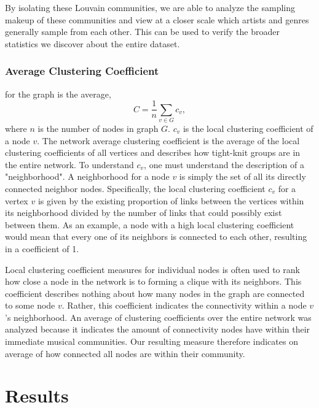 \documentclass[pageno]{jpaper}
\begin{document}
By isolating these Louvain communities, we are able to analyze the sampling makeup of these communities and view at a closer scale which artists and genres generally sample from each other. This can be used to verify the broader statistics we discover about the entire dataset. 
\subsubsection{Average Clustering Coefficient}
for the graph is the average, 
\begin{equation}
C = \frac{1}{n}\sum_{v \in G} c_v,
\end{equation} where $n$ is the number of nodes in graph $G$.  $c_v$ is the local clustering coefficient of a node $v$. The network average clustering coefficient is the average of the local clustering coefficients of all vertices and describes how tight-knit groups are in the entire network. 
To understand $c_v$, one must understand the description of a "neighborhood". A neighborhood for a node $v$ is simply the set of all its directly connected neighbor nodes. Specifically, the local clustering coefficient $c_v$ for a vertex $v$ is given by the existing proportion of links between the vertices within its neighborhood divided by the number of links that could possibly exist between them. As an example, a node with a high local clustering coefficient would mean that every one of its neighbors is connected to each other, resulting in a coefficient of 1. 

Local clustering coefficient measures for individual nodes is often used to rank how close a node in the network is to forming a clique with its neighbors. This coefficient describes nothing about how many nodes in the graph are connected to some node $v$. Rather, this coefficient indicates the connectivity within a node $v$'s neighborhood. An average of clustering coefficients over the entire network was analyzed because it indicates the amount of connectivity nodes have within their immediate musical communities. Our resulting measure therefore indicates on average of how connected all nodes are within their community.
 
\section{Results}
\end{document}
